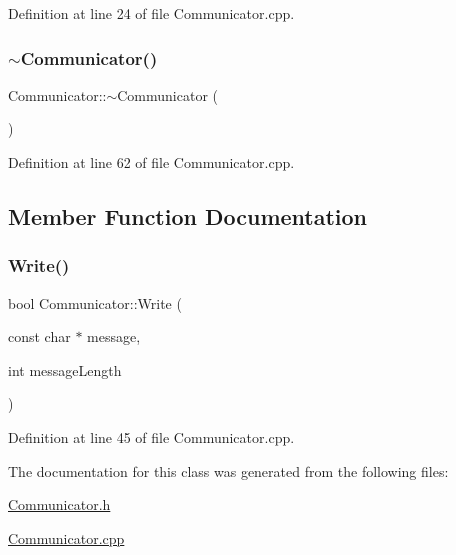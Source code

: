 Definition at line 24 of file Communicator.\+cpp.

\mbox{\label{class_communicator_a4ced5362bf7438924f8d7f1b0c5ec391}} 
\subsubsection{\texorpdfstring{$\sim$\+Communicator()}{~Communicator()}}
{\footnotesize\ttfamily Communicator\+::$\sim$\+Communicator (\begin{DoxyParamCaption}{ }\end{DoxyParamCaption})}



Definition at line 62 of file Communicator.\+cpp.



\subsection{Member Function Documentation}
\mbox{\label{class_communicator_adfc4f5c9dc389520bcd6d49214564b06}} 
\subsubsection{\texorpdfstring{Write()}{Write()}}
{\footnotesize\ttfamily bool Communicator\+::\+Write (\begin{DoxyParamCaption}\item[{const char $\ast$}]{message,  }\item[{int}]{message\+Length }\end{DoxyParamCaption})}



Definition at line 45 of file Communicator.\+cpp.



The documentation for this class was generated from the following files\+:\begin{DoxyCompactItemize}
\item 
\mbox{\hyperlink{_communicator_8h}{Communicator.\+h}}\item 
\mbox{\hyperlink{_communicator_8cpp}{Communicator.\+cpp}}\end{DoxyCompactItemize}
